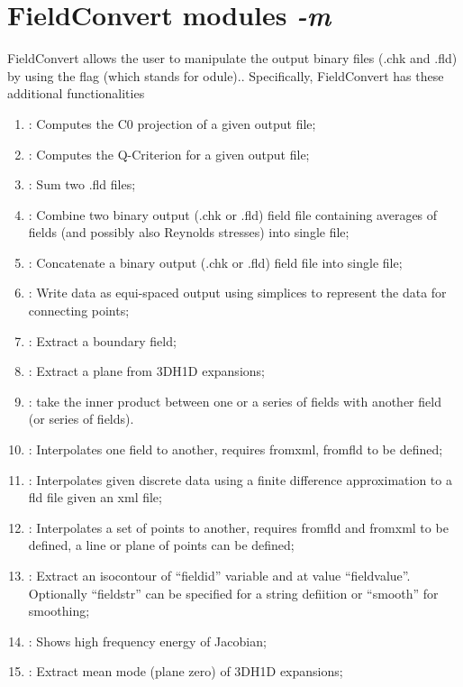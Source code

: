 \section{FieldConvert modules \textit{-m}}
FieldConvert allows the user to manipulate the \nekpp output
binary files (.chk and .fld) by using the flag  (which
stands for odule)..
Specifically, FieldConvert has these additional functionalities
%
\begin{enumerate}
\item {}: Computes the C0 projection of a given output file;
\item {}: Computes the Q-Criterion for a given output file;
\item {}: Sum two .fld files;
\item {}: Combine two \nekpp binary output (.chk or .fld) field file containing averages of fields (and
possibly also Reynolds stresses) into single file;
\item {}: Concatenate a \nekpp binary output (.chk or .fld) field file into single file;
\item {}: Write data as equi-spaced output using simplices to represent the data for connecting points;
\item {}: Extract a boundary field;
\item {}: Extract a plane from 3DH1D expansions;
\item {}: take the inner product between one or a series of fields with another field (or series of fields). 
\item {}: Interpolates one field to another, requires fromxml, fromfld to be defined;
\item {}: Interpolates given discrete data using a finite difference approximation to a fld file given an xml file;
\item {}: Interpolates a set of points to another, requires fromfld and fromxml to be defined, a line or plane of points can be defined;
\item {}: Extract an isocontour of ``fieldid'' variable and at value ``fieldvalue''. Optionally ``fieldstr'' can be specified for a string defiition or ``smooth'' for smoothing;
\item {}: Shows high frequency energy of Jacobian;
\item {}: Extract mean mode (plane zero) of 3DH1D expansions;

\end{enumerate}
